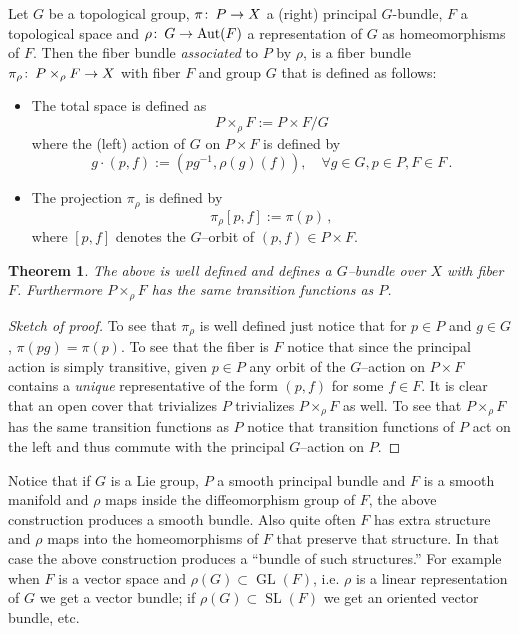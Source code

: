 \documentclass[12pt]{article}
\newtheorem{thm}{Theorem}
\theoremstyle{definition}
\theoremstyle{remark}
\numberwithin{equation}{subsection}
\newcommand{\Gr}{\rho}
\newcommand{\Au}{\text{Aut}}
\def\co{\colon\thinspace}
\begin{document}
Let $G$ be a topological group, $\pi\co P\to X$ a (right) principal $G$-bundle,
$F$  a topological  space and $\Gr\co G\to \Au(F)$ a 
representation of  $G$ as homeomorphisms of $F$. Then the fiber bundle
\emph{associated} to $P$ by $\Gr$, is a fiber bundle $\pi_\Gr\co P\times_\Gr F 
\to X$ with fiber $F$ and group $G$ that is defined as follows:
\begin{itemize}
\item The total space is defined as 
$$P\times_\Gr F:=P\times F/G$$
where the (left) action of $G$ on $P\times F$ is defined by
$$g\cdot (p,f):=\left(pg^{-1},\Gr(g)(f)\right), \quad \forall g\in G, p\in P, F\in
F\,.$$
\item The projection $\pi_\Gr$ is defined by 
$$\pi_\Gr[p,f]:=\pi(p)\,,$$
where $[p,f]$ denotes the $G$--orbit of $(p,f)\in P\times F$. 
\end{itemize}

\begin{thm}
  The above is well defined and  defines a $G$--bundle over $X$ with fiber
  $F$. Furthermore $P\times_\Gr F$ has the same transition functions as $P$. 
\end{thm}

\begin{proof}[Sketch of proof]
  To see that $\pi_\Gr$ is well defined just notice that for $p\in P$ and
  $g\in G$,  $\pi(pg)=\pi(p)$. To see that the fiber is $F$ notice that since
  the principal action is simply transitive, given $p\in P$ any orbit of the
  $G$--action on $P\times F$ contains a \emph{unique} representative of the
  form $(p,f)$ for some $f\in F$. It is clear that an open cover that
  trivializes $P$ trivializes $P\times_\Gr F$ as well.
  To see that $P\times_\Gr F$ has the same
  transition functions as $P$ notice that transition functions of $P$  act on the
  left and thus commute with the principal $G$--action on $P$.  
\end{proof}

Notice that if $G$ is a Lie group, $P$ a smooth principal bundle and $F$ is a
smooth manifold and $\Gr$ maps inside the diffeomorphism group of $F$, the
above construction produces a smooth bundle. Also quite often $F$ has extra
structure and $\Gr$ maps into the homeomorphisms of $F$ that preserve that
structure. In that case the above construction produces a ``bundle of such
structures.''  For example    when $F$ is a vector space and
$\Gr(G) \subset \operatorname{GL}(F) $, i.e. $\Gr$ is a linear
representation  of $G$ we get
a vector bundle; if   $\Gr(G) \subset \operatorname{SL}(F)$ we get an
oriented vector bundle, etc.    

\end{document}
